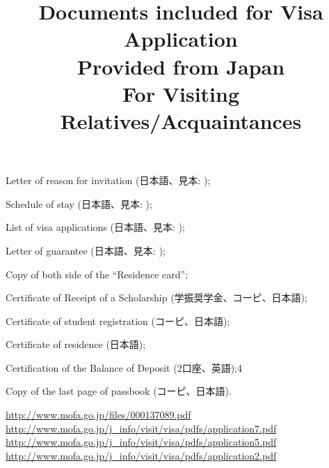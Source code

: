 \documentclass[12pt]{article} %
\title{Documents included for Visa Application\\Provided from Japan\\For Visiting Relatives/Acquaintances}
\newcommand{\cmark}{\ding{51}}%
\newcommand{\done}{\rlap{$\square$}{\raisebox{2pt}{\large\hspace{1pt}\cmark}}%
\hspace{-2.5pt}}
\begin{document}
\maketitle
\begin{todolist}
	\item[\done] Letter of reason for invitation (日本語、見本: \cite{reasonletter});
	\item Schedule of stay (日本語、見本: \cite{schedule});
	\item[\done] List of visa applications (日本語、見本: \cite{applicantlist});
	\item[\done] Letter of guarantee (日本語、見本: \cite{guarantee});
	\item Copy of both side of the ``Residence card'';
	\item Certificate of Receipt of a Scholarship (学振奨学金、コーピ、日本語);
	\item Certificate of student registration (コーピ、日本語);
	\item Certificate of residence (日本語);
	\item Certification of the Balance of Deposit (2口座、英語);4
	\item Copy of the last page of passbook (コーピ、日本語).
\end{todolist}

\begin{thebibliography}{9}
	\url{http://www.mofa.go.jp/files/000137089.pdf}
	\url{http://www.mofa.go.jp/j_info/visit/visa/pdfs/application7.pdf}
	\url{http://www.mofa.go.jp/j_info/visit/visa/pdfs/application5.pdf}
	\url{http://www.mofa.go.jp/j_info/visit/visa/pdfs/application2.pdf}
\end{thebibliography}
\end{document}
